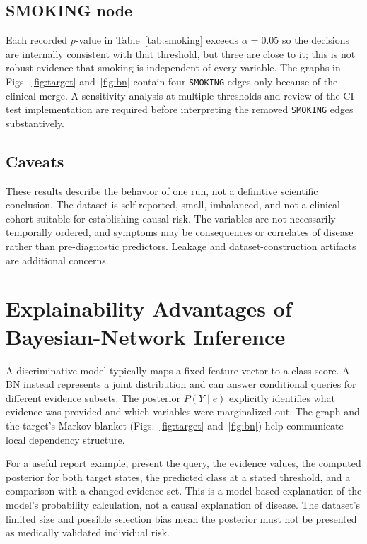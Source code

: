 \documentclass[10pt,twocolumn,letterpaper]{article}
\newcommand{\vn}[1]{{\small\texttt{#1}}}
\begin{document}
	\subsection{SMOKING node}
	Each recorded \(p\)-value in Table~\ref{tab:smoking} exceeds \(\alpha = 0.05\) so the decisions are internally consistent with that threshold, but three are close to it; this is not robust evidence that smoking is independent of every variable. The graphs in Figs.~\ref{fig:target} and~\ref{fig:bn} contain four \vn{SMOKING} edges only because of the clinical merge. A sensitivity analysis at multiple thresholds and review of the CI-test implementation are required before interpreting the removed \vn{SMOKING} edges substantively.

	\subsection{Caveats}
	These results describe the behavior of one run, not a definitive scientific conclusion. The dataset is self-reported, small, imbalanced, and not a clinical cohort suitable for establishing causal risk. The variables are not necessarily temporally ordered, and symptoms may be consequences or correlates of disease rather than pre-diagnostic predictors. Leakage and dataset-construction artifacts are additional concerns.

	\section{Explainability Advantages of Bayesian-Network Inference}
	A discriminative model typically maps a fixed feature vector to a class score. A BN instead represents a joint distribution and can answer conditional queries for different evidence subsets. The posterior \(P(Y \mid e)\) explicitly identifies what evidence was provided and which variables were marginalized out. The graph and the target's Markov blanket (Figs.~\ref{fig:target} and~\ref{fig:bn}) help communicate local dependency structure.

	For a useful report example, present the query, the evidence values, the computed posterior for both target states, the predicted class at a stated threshold, and a comparison with a changed evidence set. This is a model-based explanation of the model's probability calculation, not a causal explanation of disease. The dataset's limited size and possible selection bias mean the posterior must not be presented as medically validated individual risk.
\end{document}
